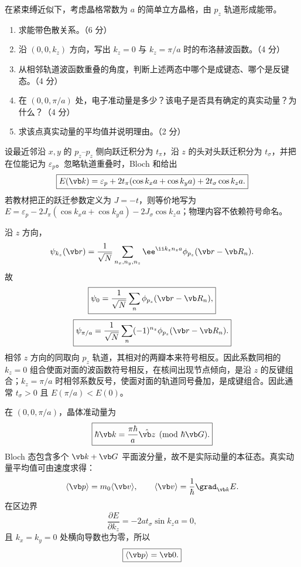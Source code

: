 \begin{question}[20 分]
在紧束缚近似下，考虑晶格常数为 $a$ 的简单立方晶格，由 $p_z$ 轨道形成能带。
\begin{enumerate}
  \item 求能带色散关系。（6 分）
  \item 沿 $(0,0,k_z)$ 方向，写出 $k_z=0$ 与 $k_z=\pi/a$ 时的布洛赫波函数。（4 分）
  \item 从相邻轨道波函数重叠的角度，判断上述两态中哪个是成键态、哪个是反键态。（4 分）
  \item 在 $(0,0,\pi/a)$ 处，电子准动量是多少？该电子是否具有确定的真实动量？为什么？（4 分）
  \item 求该点真实动量的平均值并说明理由。（2 分）
\end{enumerate}


\begin{solution}
设最近邻沿 $x,y$ 的 $p_z$--$p_z$ 侧向跃迁积分为 $t_\pi$，沿 $z$ 的头对头跃迁积分为 $t_\sigma$，并把在位能记为 $\varepsilon_p$。忽略轨道重叠时，Bloch 和给出
\[
 \boxed{E(\vb k)=\varepsilon_p+2t_\pi(\cos k_xa+\cos k_ya)
 +2t_\sigma\cos k_za.}
\]
若教材把正的跃迁参数定义为 $J=-t$，则等价地写为
$E=\varepsilon_p-2J_\pi(\cos k_xa+\cos k_ya)-2J_\sigma\cos k_za$；物理内容不依赖符号命名。

沿 $z$ 方向，
\[
 \psi_{k_z}(\vb r)=\frac1{\sqrt N}\sum_{n_x,n_y,n_z}
 \ee^{\ii k_zn_za}\phi_{p_z}(\vb r-\vb R_n).
\]
故
\[
 \boxed{\psi_0=\frac1{\sqrt N}\sum_n\phi_{p_z}(\vb r-\vb R_n),}
\]
\[
 \boxed{\psi_{\pi/a}=\frac1{\sqrt N}\sum_n(-1)^{n_z}
 \phi_{p_z}(\vb r-\vb R_n).}
\]
相邻 $z$ 方向的同取向 $p_z$ 轨道，其相对的两瓣本来符号相反。因此系数同相的 $k_z=0$ 组合使面对面的波函数符号相反，在核间出现节点倾向，是沿 $z$ 的反键组合；$k_z=\pi/a$ 时相邻系数反号，使面对面的轨道同号叠加，是成键组合。因此通常 $t_\sigma>0$ 且
$E(\pi/a)<E(0)$。

在 $(0,0,\pi/a)$，晶体准动量为
\[
 \boxed{\hbar\vb k=\frac{\pi\hbar}{a}\hat{\vb z}
 \pmod{\hbar\vb G}.}
\]
Bloch 态包含多个 $\vb k+\vb G$ 平面波分量，故不是实际动量的本征态。真实动量平均值可由速度求得：
\[
 \langle\vb p\rangle=m_0\langle\vb v\rangle,
 \qquad
 \langle\vb v\rangle=\frac1\hbar\grad_{\vb k}E.
\]
在区边界
\[
 \frac{\partial E}{\partial k_z}=-2at_\sigma\sin k_za=0,
\]
且 $k_x=k_y=0$ 处横向导数也为零，所以
\[
 \boxed{\langle\vb p\rangle=\vb0.}
\]
\end{solution}
\end{question}

